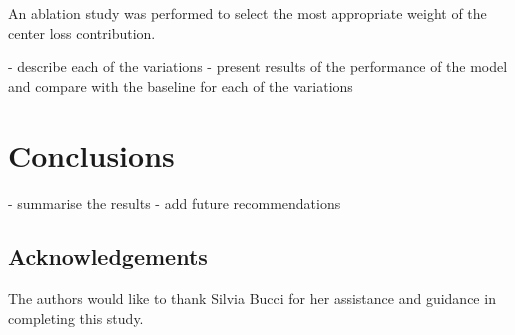 \documentclass[10pt,twocolumn,letterpaper]{article}
\begin{document}
An ablation study was performed to select the most appropriate weight of the center loss contribution.


- describe each of the variations
- present results of the performance of the model and compare with the baseline for each of the variations

\section{Conclusions}
\label{sec:conclusion}

- summarise the results
- add future recommendations

\subsection{Acknowledgements}
The authors would like to thank Silvia Bucci for her assistance and guidance in completing this study.


{\small


}
\end{document}
